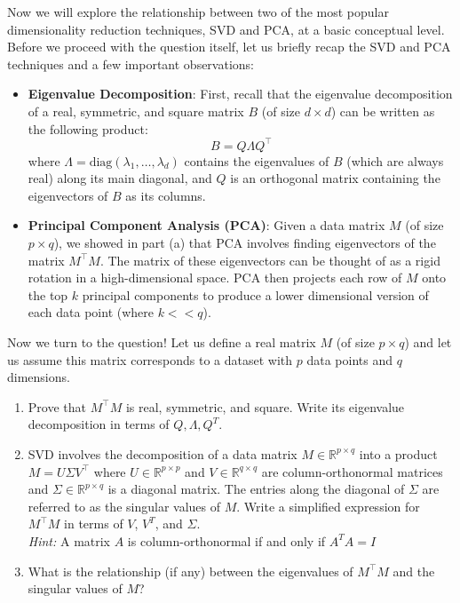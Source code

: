 \item {} Now we will explore the relationship between two of the most popular dimensionality reduction techniques, SVD and PCA, at a basic conceptual level. Before we proceed with the question itself, let us briefly recap the SVD and PCA techniques and a few important observations:

\begin{itemize}
    \item \textbf{Eigenvalue Decomposition}: First, recall that the eigenvalue decomposition of a real, symmetric, and square matrix \( B \) (of size \( d \times d \)) can be written as the following product:
    \[
    B = Q \Lambda Q^\top
    \]
    where \( \Lambda = \text{diag}(\lambda_1, \dots, \lambda_d) \) contains the eigenvalues of \( B \) (which are always real) along its main diagonal, and \( Q \) is an orthogonal matrix containing the eigenvectors of \( B \) as its columns.
    
    \item \textbf{Principal Component Analysis (PCA)}: Given a data matrix \( M \) (of size \( p \times q \)), we showed in part (a) that PCA involves finding eigenvectors of the matrix \( M^\top M \). The matrix of these eigenvectors can be thought of as a rigid rotation in a high-dimensional space. PCA then projects each row of $M$ onto the top $k$ principal components to produce a lower dimensional version of each data point (where $k << q$).
\end{itemize}

Now we turn to the question! Let us define a real matrix \( M \) (of size \( p \times q \)) and let us assume this matrix corresponds to a dataset with \( p \) data points and \( q \) dimensions.

\begin{enumerate}
    \item {} Prove that \( M^\top M \) is real, symmetric, and square. Write its eigenvalue decomposition in terms of $Q, \Lambda, Q^T$.
    
    \item {} SVD involves the decomposition of a data matrix \( M \in \mathbb{R}^{p \times q} \) into a product $M = U \Sigma V^\top$ where \( U \in \mathbb{R}^{p \times p} \) and \( V \in \mathbb{R}^{q \times q} \) are column-orthonormal matrices and \( \Sigma \in \mathbb{R}^{p \times q} \) is a diagonal matrix. The entries along the diagonal of \( \Sigma \) are referred to as the singular values of \( M \). Write a simplified expression for \( M^\top M \) in terms of \( V \), \( V^T \), and \( \Sigma \).\\
    \textit{Hint:} A matrix $A$ is column-orthonormal if and only if $A^T A = I$

    \item {} What is the relationship (if any) between the eigenvalues of \( M^\top M \) and the singular values of \( M \)?

\end{enumerate}


